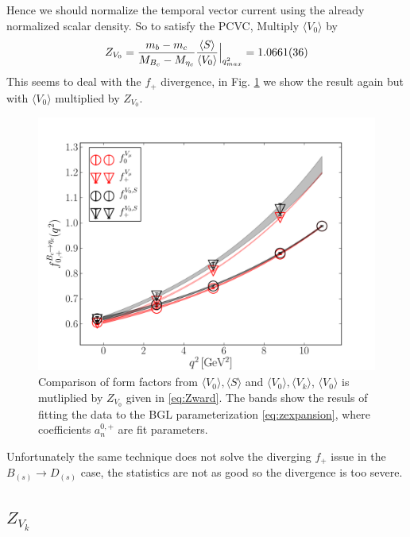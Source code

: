 Hence we should normalize the temporal vector current using the already normalized scalar density. So to satisfy the PCVC, Multiply $\langle V_0 \rangle$ by 
\begin{align}
	Z_{V_0} = {m_b-m_c \over M_{B_c}-M_{\eta_c} } { \langle S \rangle \over \langle V_0 \rangle }\Big\vert_{q^2_{max}} = 1.0661(36)
	\label{eq:Zward}
\end{align}
This seems to deal with the $f_+$ divergence, in Fig. \ref{fig:Zward} we show the result again but with $\langle V_0 \rangle$ multiplied by $Z_{V_0}$.
\begin{figure}[htb!]
\centering
\includegraphics[scale=0.55]{images/nrqcd/Bcetac_bothways_2.pdf}
\caption{Comparison of form factors from $\langle V_0 \rangle,\langle S \rangle $ and $\langle V_0\rangle,\langle V_k\rangle$, $\langle V_0\rangle$ is mutliplied by $Z_{V_0}$ given in \eqref{eq:Zward}. The bands show the resuls of fitting the data to the BGL parameterization \eqref{eq:zexpansion}, where coefficients $a^{0,+}_n$ are fit parameters. \label{fig:Zward}}
\end{figure}
Unfortunately the same technique does not solve the diverging $f_+$ issue in the $B_{(s)}\to D_{(s)}$ case, the statistics are not as good so the divergence is too severe. 

\subsection{$Z_{V_k}$}
\label{sec:ZVk}

